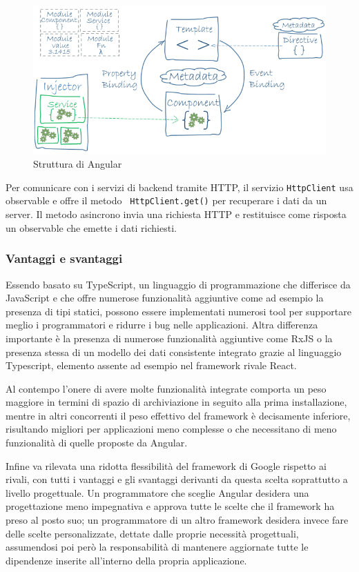 \begin{figure}[H]
\centering
\includegraphics[scale=0.5]{res/angular.png}
\caption{Struttura di Angular}
\label{fig:angular}
\end{figure}

Per comunicare con i servizi di backend tramite HTTP, il servizio \texttt{HttpClient} usa observable e offre il metodo \
\texttt{HttpClient.get()} per recuperare i dati da un server. Il metodo asincrono invia una richiesta HTTP e restituisce come risposta un observable che emette i dati richiesti.

\subsubsection{Vantaggi e svantaggi}
Essendo basato su TypeScript, un linguaggio di programmazione che differisce da JavaScript e che offre numerose funzionalità aggiuntive come ad esempio la presenza di tipi statici, possono essere implementati numerosi tool per supportare meglio i programmatori e ridurre i bug nelle applicazioni.
Altra differenza importante è la presenza di numerose funzionalità aggiuntive come RxJS o la presenza stessa di un modello dei dati consistente integrato grazie al linguaggio Typescript, elemento assente ad esempio nel framework rivale React.

Al contempo l’onere di avere molte funzionalità integrate comporta un peso maggiore in termini di spazio di archiviazione in seguito alla prima installazione, mentre in altri concorrenti il peso effettivo del framework è decisamente inferiore, risultando
migliori per applicazioni meno complesse o che necessitano di meno funzionalità di quelle proposte da Angular.

Infine va rilevata una ridotta flessibilità del framework di Google rispetto ai rivali, con tutti i vantaggi e gli svantaggi derivanti da questa scelta soprattutto a livello progettuale. Un programmatore che sceglie Angular desidera una progettazione meno
impegnativa e approva tutte le scelte che il framework ha preso al posto suo; un programmatore di un altro framework desidera invece fare delle scelte personalizzate, dettate dalle proprie necessità progettuali, assumendosi poi però la responsabilità di mantenere aggiornate tutte le dipendenze inserite all’interno della propria applicazione.

